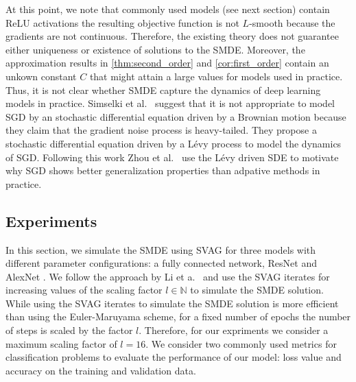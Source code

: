 \documentclass[12pt]{article}
\theoremstyle{definition}
\numberwithin{equation}{section}
\newcommand{\N}{\mathbb{N}}
\begin{document}
At this point, we note that commonly used models (see next section) contain ReLU activations the resulting objective function is not $L$-smooth because the gradients are not continuous. 
Therefore, the existing theory does not guarantee either uniqueness or existence of solutions to the SMDE. Moreover, the approximation results in \autoref{thm:second_order} and \autoref{cor:first_order} contain an unkown constant $C$ that might attain a large values for models used in practice. Thus, it is not clear whether SMDE capture the dynamics of deep learning models in practice. Simselki et al.\ \cite{simsekliTailIndexAnalysisStochastic2019} suggest that it is not appropriate to model SGD by an stochastic differential equation driven by a Brownian motion because they claim that the gradient noise process is heavy-tailed. They propose a stochastic differential equation driven by a Lévy process to model the dynamics of SGD.
Following this work Zhou et al.\ \cite{zhouTheoreticallyUnderstandingWhy2020} use the Lévy driven SDE to motivate why SGD shows better generalization properties than adpative methods in practice.

\subsection{Experiments}
\label{subsec:experiments}
In this section, we simulate the SMDE using SVAG for three models with different parameter configurations: a fully connected network, ResNet \cite{heDeepResidualLearning2016a} and AlexNet \cite{krizhevskyImageNetClassificationDeep2012}. We follow the approach by Li et a.\ \cite{liValidityModelingSGD2021} and use the SVAG iterates for increasing values of the scaling factor $l \in \N$ to simulate the SMDE solution. While using the SVAG iterates to simulate the SMDE solution is more efficient than using the Euler-Maruyama scheme, for a fixed number of epochs the number of steps is scaled by the factor $l$. Therefore, for our expriments we consider a maximum scaling factor of $l=16$. We consider two commonly used metrics for classification problems to evaluate the performance of our model: loss value and accuracy on the training and validation data.
\end{document}
